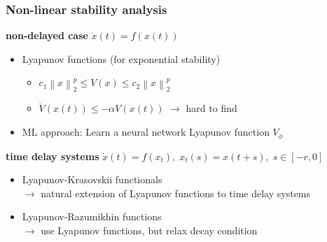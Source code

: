 \documentclass[11pt,aspectratio=169]{beamer}
\newcommand{\norm}[1]{\left\lVert#1\right\rVert}
\begin{document}
\begin{frame}[t]
    \frametitle{Non-linear stability analysis \tiny{}}
    \textbf{non-delayed case} \; $\dot{x}(t) = f(x(t))$
        \begin{itemize}
            \item Lyapunov functions (for exponential stability)
                \begin{itemize}
                    \item $c_1\norm{x}_2^p \leq V(x) \leq c_2\norm{x}_2^p$
                    \item $\dot{V}\left(x(t)\right)\leq -\alpha V(x(t))$ \hspace{1.5cm} $\to$ hard to find
                \end{itemize}
            \item ML approach: Learn a neural network Lyapunov function $V_\phi$
        \end{itemize}
        \vspace{0.5cm}
    \textbf{time delay systems} \; $\dot{x}(t) = f(x_t),\; x_t(s)=x(t+s),\; s\in[-r,0]$
        \begin{itemize}
            \item Lyapunov-Krasovskii functionals\\
            $\to$ natural extension of Lyapunov functions to time delay systems
            \item Lyapunov-Razumikhin functions\\
            $\to$ use Lyapunov functions, but relax decay condition
            
        \end{itemize}
\end{frame}

\end{document}
